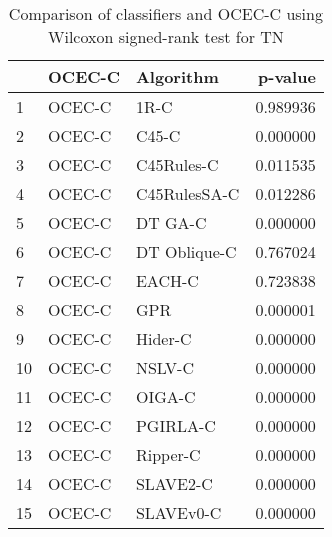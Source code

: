 \begin{table}
\footnotesize
\caption{Comparison of classifiers and OCEC-C using Wilcoxon signed-rank test for TN}
\label{tab:OCEC-C wilcoxon TN comparison}
\begin{tabular}{lllr}
\hline
 & OCEC-C & Algorithm & p-value \\
\hline
1 & OCEC-C & 1R-C & 0.989936 \\
2 & OCEC-C & C45-C & 0.000000 \\
3 & OCEC-C & C45Rules-C & 0.011535 \\
4 & OCEC-C & C45RulesSA-C & 0.012286 \\
5 & OCEC-C & DT GA-C & 0.000000 \\
6 & OCEC-C & DT Oblique-C & 0.767024 \\
7 & OCEC-C & EACH-C & 0.723838 \\
8 & OCEC-C & GPR & 0.000001 \\
9 & OCEC-C & Hider-C & 0.000000 \\
10 & OCEC-C & NSLV-C & 0.000000 \\
11 & OCEC-C & OIGA-C & 0.000000 \\
12 & OCEC-C & PGIRLA-C & 0.000000 \\
13 & OCEC-C & Ripper-C & 0.000000 \\
14 & OCEC-C & SLAVE2-C & 0.000000 \\
15 & OCEC-C & SLAVEv0-C & 0.000000 \\
\hline
\end{tabular}
\end{table}

